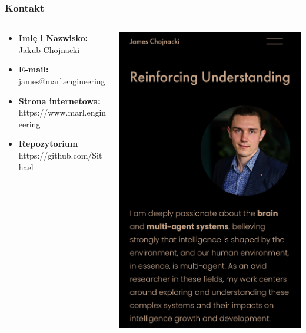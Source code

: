 \documentclass[smaller]{beamer}
\begin{document}

\begin{frame}
\frametitle{Kontakt}

\begin{columns}
    \begin{column}{0.6\textwidth}
        \begin{itemize}
            \item \textbf{Imię i Nazwisko:} Jakub Chojnacki
            \item \textbf{E-mail:} james@marl.engineering
            \item \textbf{Strona internetowa:} https://www.marl.engineering
            \item \textbf{Repozytorium} https://github.com/Sithael
        \end{itemize}
    \end{column}

    \begin{column}{0.4\textwidth}
        \includegraphics[width=\textwidth]{../manifest/marl-engineering.jpg}
    \end{column}
\end{columns}
\end{frame}
\end{document}
